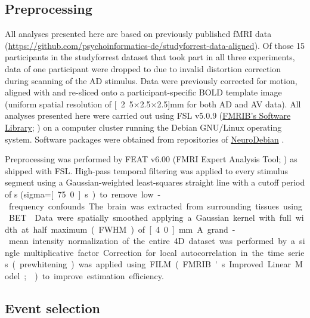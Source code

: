 \documentclass[english]{article}
\begin{document}
\subsection{Preprocessing}

All analyses presented here are based on previously published fMRI data
(\url{https://github.com/psychoinformatics-de/studyforrest-data-aligned}).
Of those 15 participants in the studyforrest dataset that took
part in all three experiments,
data of one participant were dropped to due to invalid distortion correction
during scanning of the AD stimulus.
Data were previously corrected for motion, aligned with and re-sliced onto a
participant-specific BOLD template image \citep{sengupta2016extension}
(uniform spatial resolution of \unit[2.5$\times$2.5$\times$2.5]{mm} for both
AD and AV data).
All analyses presented here were carried out using
FSL v5.0.9 (\href{https://www.fmrib.ox.ac.uk/fsl}{FMRIB's Software Library};
\citep{smith2004fsl}) on a computer cluster running the Debian GNU/Linux
operating system. Software packages were obtained from repositories of
\href{http://neuro.debian.net}{NeuroDebian} \citep{halchenko2012open}.

Preprocessing was performed by FEAT v6.00 (FMRI Expert Analysis Tool;
\citep{woolrich2001autocorr}) as shipped with FSL.
High-pass temporal filtering was applied to every stimulus segment using a
Gaussian-weighted least-squares straight line with a cutoff period of
\unit[150]{s} (sigma=\unit[75.0]{s}) to remove low-frequency confounds.
The brain was extracted from surrounding tissues using BET \citep{smith2002bet}.
Data were spatially smoothed applying a Gaussian kernel with full width at half
maximum (FWHM) of \unit[4.0]{mm}.
A grand-mean intensity normalization of the entire 4D dataset was performed by a
single multiplicative factor.
Correction for local autocorrelation in the time series (prewhitening) was
applied using FILM (FMRIB's Improved Linear Model; \citep{woolrich2001autocorr})
to improve estimation efficiency.


\subsection{Event selection}
\end{document}
